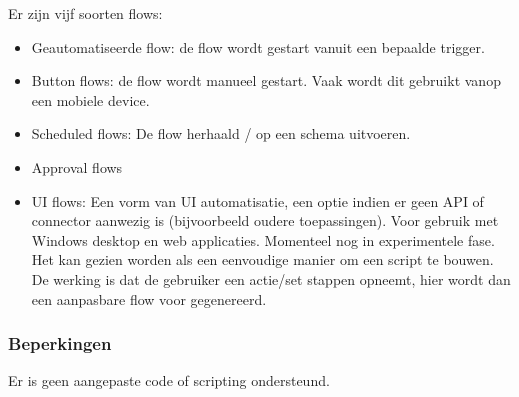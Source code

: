 Er zijn vijf soorten flows:
\begin{itemize}
    \item Geautomatiseerde flow: de flow wordt gestart vanuit een bepaalde trigger.
    \item Button flows: de flow wordt manueel gestart. Vaak wordt dit gebruikt vanop een mobiele device.
    \item Scheduled flows: De flow herhaald / op een schema uitvoeren.
    \item Approval flows
    \item UI flows: Een vorm van UI automatisatie, een optie indien er geen API of connector aanwezig is (bijvoorbeeld oudere toepassingen). Voor gebruik met Windows desktop en web applicaties. Momenteel nog in experimentele fase. Het kan gezien worden als een eenvoudige manier om een script te bouwen. De werking is dat de gebruiker een actie/set stappen opneemt, hier wordt dan een aanpasbare flow voor gegenereerd. \autocite{MPA2019}
\end{itemize}

\subsubsection{Beperkingen}

Er is geen aangepaste code of scripting ondersteund.